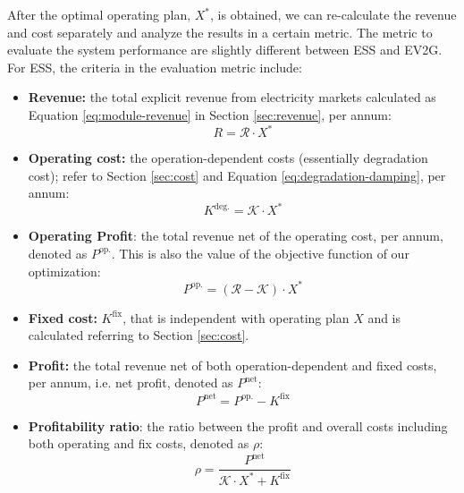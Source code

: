 After the optimal operating plan, $X^*$, is obtained, we can re-calculate the revenue and cost separately and analyze the results in a certain metric. The metric to evaluate the system performance are slightly different between ESS and EV2G. For ESS, the criteria in the evaluation metric include:
\begin{itemize}
	\item \textbf{Revenue:} the total explicit revenue from electricity markets calculated as Equation \eqref{eq:module-revenue} in Section \ref{sec:revenue}, per annum:
	\begin{equation*}
	R =  \mathcal{R} \cdot X^*
	\end{equation*}
	
	\item \textbf{Operating cost:} the operation-dependent costs (essentially degradation cost); refer to Section \ref{sec:cost} and Equation \eqref{eq:degradation-damping}, per annum:
	\begin{equation*}
	K^{\text{deg.}} =  \mathcal{K} \cdot X^*
	\end{equation*}
	
	\item \textbf{Operating Profit}: the total revenue net of the operating cost, per annum, denoted as $P^{\text{op.}}$. This is also the value of the objective function of our optimization: 
	\begin{equation*}
	P^{\text{op.}} = \left( \mathcal{R} - \mathcal{K} \right) \cdot X^*
	\end{equation*}
	
	\item \textbf{Fixed cost:} $K^{\text{fix}}$, that is independent with operating plan $X$ and is calculated referring to Section \ref{sec:cost}. 
	
	\item \textbf{Profit:} the total revenue net of both operation-dependent and fixed costs, per annum, i.e. net profit, denoted as $P^{\text{net}}$:
	\begin{equation*}
	P^{\text{net}} = P^{\text{op.}} - K^{\text{fix}}
	\end{equation*}
	
	\item  \textbf{Profitability ratio}: the ratio between the profit and overall costs including both operating and fix costs, denoted as $\rho$: 
	\begin{equation*}
	\rho = 	\frac{P^{\text{net}}}{\mathcal{K} \cdot X^* + K^{\text{fix}}}
	\end{equation*}
	
\end{itemize}

